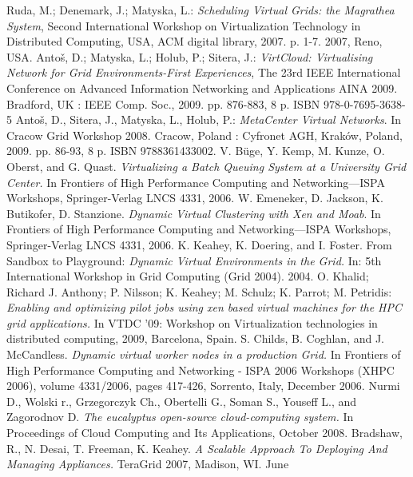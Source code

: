 \documentclass[a4paper]{article}
\begin{document}
	\begin{thebibliography}{10}
	 Ruda, M.; Denemark, J.; Matyska, L.: \emph{Scheduling Virtual Grids: the Magrathea System},
	   Second International Workshop on Virtualization Technology in Distributed Computing, USA,
	   ACM digital library, 2007. p. 1-7. 2007, Reno, USA.
	Anto\v s, D.; Matyska, L.; Holub, P.; Sitera, J.: \emph{VirtCloud: Virtualising Network
	   for Grid Environments-First Experiences}, The 23rd IEEE International Conference on Advanced
	   Information Networking and Applications AINA 2009. Bradford, UK : IEEE Comp. Soc., 2009. pp.
	   876-883, 8 p. ISBN 978-0-7695-3638-5
         Anto\v s, D., Sitera, J., Matyska, L., Holub, P.: \emph{MetaCenter
         Virtual Networks}. In Cracow Grid Workshop 2008. Cracow, Poland : Cyfronet
         AGH, Krak\'ow, Poland, 2009. pp. 86-93, 8 p. ISBN 9788361433002.
	V. B\"uge, Y. Kemp, M. Kunze, O. Oberst, and G. Quast.
	\emph{Virtualizing a Batch Queuing System at a University Grid Center.}
	In {Frontiers of High Performance Computing and Networking---ISPA
	Workshops}, Springer-Verlag LNCS 4331, 2006.
	W. Emeneker, D. Jackson, K. Butikofer, D. Stanzione.
	\emph{Dynamic Virtual Clustering with Xen and Moab}.
	In {Frontiers of High Performance Computing and Networking---ISPA
	Workshops}, Springer-Verlag LNCS 4331, 2006.
	K. Keahey, K. Doering, and I. Foster. From Sandbox to Playground: \emph{Dynamic Virtual
	Environments in the Grid.} In: {5th International Workshop in Grid Computing
	(Grid 2004)}. 2004.
	O. Khalid; Richard J. Anthony; P. Nilsson; K. Keahey; M. Schulz; K. Parrot; M. Petridis:
	\emph{Enabling and optimizing pilot jobs using xen based virtual machines for the HPC grid applications.} In
	VTDC '09: Workshop on Virtualization technologies in distributed computing,
	2009, Barcelona, Spain.
	S. Childs, B. Coghlan, and J. McCandless. \emph{Dynamic virtual worker nodes in a production Grid.} 
        In Frontiers of High Performance Computing and Networking - ISPA
	2006 Workshops (XHPC 2006), volume 4331/2006, pages 417-426, Sorrento, Italy, December 2006.
	 Nurmi D., Wolski r., Grzegorczyk Ch., Obertelli G.,
	    Soman S., Youseff L., and Zagorodnov D. \emph{The eucalyptus
	    open-source cloud-computing system.} In Proceedings of Cloud
	    Computing and Its Applications, October 2008.
	Bradshaw, R., N. Desai, T. Freeman, K. Keahey. 
        \emph{A Scalable Approach To Deploying And Managing Appliances.} TeraGrid 2007, Madison, WI. June

\end{thebibliography}
\end{document}

